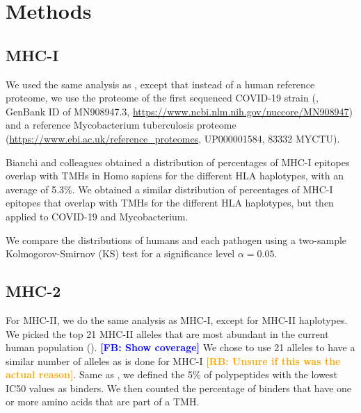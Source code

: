 \documentclass{article}
\newcommand{\frans}[1]{\textcolor{blue}{\textbf{[FB: #1]}}}
\newcommand{\richel}[1]{\textcolor{orange}{\textbf{[RB: #1]}}}
\begin{document}
\section{Methods}

\subsection{MHC-I}

We used the same analysis as \cite{bianchi2017},
except that instead of a human reference proteome,
we use the proteome of the first sequenced COVID-19 strain (\cite{wu2020new},
GenBank ID of MN908947.3, \url{https://www.ncbi.nlm.nih.gov/nuccore/MN908947})
and a reference Mycobacterium tuberculosis 
proteome (\url{https://www.ebi.ac.uk/reference_proteomes}, UP000001584, 
83332 MYCTU).

Bianchi and colleagues obtained a distribution of 
percentages of MHC-I epitopes overlap with TMHs in Homo sapiens
for the different HLA haplotypes, with an average of 5.3\%.
We obtained a similar distribution of percentages of MHC-I epitopes that 
overlap with TMHs for the different HLA haplotypes, but then applied to
COVID-19 and Mycobacterium.

We compare the distributions of humans and each pathogen
using a two-sample Kolmogorov-Smirnov (KS) test
for a significance level $\alpha = 0.05$.

\subsection{MHC-2}


For MHC-II, we do the same analysis as MHC-I, except for
MHC-II haplotypes. We picked the top 21 MHC-II alleles that are most abundant 
in the current human population (\cite{greenbaum2011functional}).
\frans{Show coverage}
We chose to use 21 alleles to have a similar number of alleles as is done
for MHC-I \richel{Unsure if this was the actual reason}.
Same as \cite{bianchi2017}, we defined the 5\% of polypeptides 
with the lowest IC50 values as binders. We then counted the percentage
of binders that have one or more amino acids that are part of a TMH.
\end{document}
